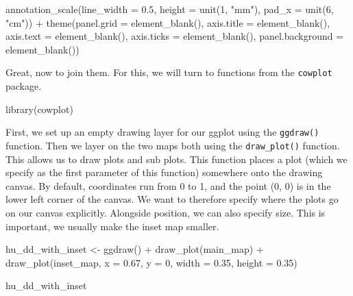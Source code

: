 \documentclass[
]{book}
\newenvironment{Shaded}{\begin{snugshade}}{\end{snugshade}}
\newcommand{\AttributeTok}[1]{\textcolor[rgb]{0.77,0.63,0.00}{#1}}
\newcommand{\DecValTok}[1]{\textcolor[rgb]{0.00,0.00,0.81}{#1}}
\newcommand{\FloatTok}[1]{\textcolor[rgb]{0.00,0.00,0.81}{#1}}
\newcommand{\FunctionTok}[1]{\textcolor[rgb]{0.00,0.00,0.00}{#1}}
\newcommand{\NormalTok}[1]{#1}
\newcommand{\OtherTok}[1]{\textcolor[rgb]{0.56,0.35,0.01}{#1}}
\newcommand{\SpecialCharTok}[1]{\textcolor[rgb]{0.00,0.00,0.00}{#1}}
\newcommand{\StringTok}[1]{\textcolor[rgb]{0.31,0.60,0.02}{#1}}
\begin{document}
\begin{Shaded}
\begin{Highlighting}[]
  \FunctionTok{annotation\_scale}\NormalTok{(}\AttributeTok{line\_width =} \FloatTok{0.5}\NormalTok{, }\AttributeTok{height =} \FunctionTok{unit}\NormalTok{(}\DecValTok{1}\NormalTok{, }\StringTok{"mm"}\NormalTok{), }\AttributeTok{pad\_x =} \FunctionTok{unit}\NormalTok{(}\DecValTok{6}\NormalTok{, }\StringTok{"cm"}\NormalTok{)) }\SpecialCharTok{+} 
  \FunctionTok{theme}\NormalTok{(}\AttributeTok{panel.grid =} \FunctionTok{element\_blank}\NormalTok{(),}
        \AttributeTok{axis.title =} \FunctionTok{element\_blank}\NormalTok{(),}
        \AttributeTok{axis.text =} \FunctionTok{element\_blank}\NormalTok{(),}
        \AttributeTok{axis.ticks =} \FunctionTok{element\_blank}\NormalTok{(),}
        \AttributeTok{panel.background =} \FunctionTok{element\_blank}\NormalTok{())}
\end{Highlighting}
\end{Shaded}

Great, now to join them. For this, we will turn to functions from the \texttt{cowplot} package.

\begin{Shaded}
\begin{Highlighting}[]
\FunctionTok{library}\NormalTok{(cowplot)}
\end{Highlighting}
\end{Shaded}

First, we set up an empty drawing layer for our ggplot using the \texttt{ggdraw()} function. Then we layer on the two maps both using the \texttt{draw\_plot()} function. This allows us to draw plots and sub plots. This function places a plot (which we specify as the first parameter of this function) somewhere onto the drawing canvas. By default, coordinates run from 0 to 1, and the point (0, 0) is in the lower left corner of the canvas. We want to therefore specify where the plots go on our canvas explicitly. Alongside position, we can also specify size. This is important, we usually make the inset map smaller.

\begin{Shaded}
\begin{Highlighting}[]
\NormalTok{hu\_dd\_with\_inset }\OtherTok{\textless{}{-}} \FunctionTok{ggdraw}\NormalTok{() }\SpecialCharTok{+}
  \FunctionTok{draw\_plot}\NormalTok{(main\_map) }\SpecialCharTok{+}
  \FunctionTok{draw\_plot}\NormalTok{(inset\_map, }\AttributeTok{x =} \FloatTok{0.67}\NormalTok{, }\AttributeTok{y =} \DecValTok{0}\NormalTok{, }\AttributeTok{width =} \FloatTok{0.35}\NormalTok{, }\AttributeTok{height =} \FloatTok{0.35}\NormalTok{)}

\NormalTok{hu\_dd\_with\_inset}
\end{Highlighting}
\end{Shaded}
\end{document}
